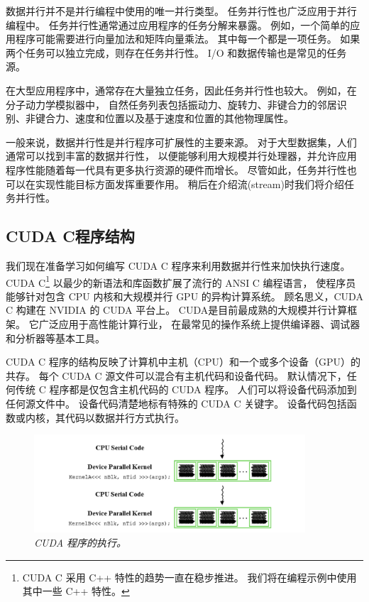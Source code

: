 \begin{remark}[任务并行与数据并行]
数据并行并不是并行编程中使用的唯一并行类型。 任务并行性也广泛应用于并行编程中。 
任务并行性通常通过应用程序的任务分解来暴露。 例如，一个简单的应用程序可能需要进行向量加法和矩阵向量乘法。 
其中每一个都是一项任务。 如果两个任务可以独立完成，则存在任务并行性。 I/O 和数据传输也是常见的任务源。

在大型应用程序中，通常存在大量独立任务，因此任务并行性也较大。 例如，在分子动力学模拟器中，
自然任务列表包括振动力、旋转力、非键合力的邻居识别、非键合力、速度和位置以及基于速度和位置的其他物理属性。

一般来说，数据并行性是并行程序可扩展性的主要来源。 对于大型数据集，人们通常可以找到丰富的数据并行性，
以便能够利用大规模并行处理器，并允许应用程序性能随着每一代具有更多执行资源的硬件而增长。 
尽管如此，任务并行性也可以在实现性能目标方面发挥重要作用。 稍后在介绍流(stream)时我们将介绍任务并行性。
\end{remark}

\subsection{CUDA C程序结构}
我们现在准备学习如何编写 CUDA C 程序来利用数据并行性来加快执行速度。 
CUDA C\footnote{CUDA C 采用 C++ 特性的趋势一直在稳步推进。 我们将在编程示例中使用其中一些 C++ 特性。} 
以最少的新语法和库函数扩展了流行的 ANSI C 编程语言，
使程序员能够针对包含 CPU 内核和大规模并行 GPU 的异构计算系统。 顾名思义，CUDA C 构建在 NVIDIA 的 CUDA 平台上。 
CUDA是目前最成熟的大规模并行计算框架。 它广泛应用于高性能计算行业，
在最常见的操作系统上提供编译器、调试器和分析器等基本工具。

CUDA C 程序的结构反映了计算机中主机（CPU）和一个或多个设备（GPU）的共存。 
每个 CUDA C 源文件可以混合有主机代码和设备代码。 默认情况下，任何传统 C 程序都是仅包含主机代码的 CUDA 程序。 
人们可以将设备代码添加到任何源文件中。 设备代码清楚地标有特殊的 CUDA C 关键字。 
设备代码包括函数或内核，其代码以数据并行方式执行。

\begin{figure}[H]
	\centering
	\includegraphics[width=0.9\textwidth]{figs/F2.3.png}
	\caption{\textit{CUDA 程序的执行。}}
\end{figure}

